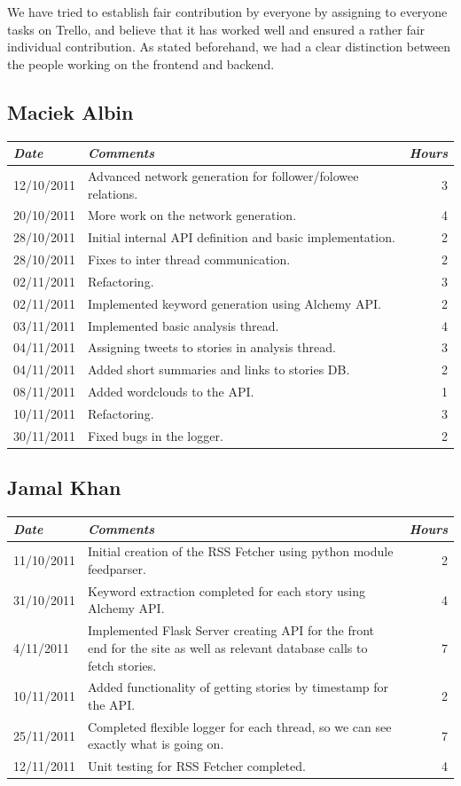 \documentclass{report}
\begin{document}
				We have tried to establish fair contribution by everyone by assigning to everyone tasks on Trello, and believe that it has worked well and ensured a rather fair individual contribution. As stated beforehand, we had a clear distinction between the people working on the frontend and backend.
		
		  \subsection{Maciek Albin}
		    \begin{tabular}{l | p{10cm} r}
		     \emph{\large Date} & \emph{\large Comments} & \emph{\large Hours}\\
		     \hline
		     12/10/2011 & Advanced network generation for follower/folowee relations. & 3\\
		     20/10/2011 & More work on the network generation. & 4\\
		     28/10/2011 & Initial internal API definition and basic implementation. & 2\\
		     28/10/2011 & Fixes to inter thread communication. & 2\\
		     02/11/2011 & Refactoring. & 3\\
		     02/11/2011 & Implemented keyword generation using Alchemy API. & 2\\
		     03/11/2011 & Implemented basic analysis thread. & 4\\
		     04/11/2011 & Assigning tweets to stories in analysis thread. & 3\\
		     04/11/2011 & Added short summaries and links to stories DB. & 2\\
		     08/11/2011 & Added wordclouds to the API. & 1\\
		     10/11/2011 & Refactoring. & 3\\
		     30/11/2011 & Fixed bugs in the logger. & 2
		    \end{tabular}

		  \subsection{Jamal Khan}
		  \begin{tabular}{l | p{10cm} r}
	     \emph{\large Date} & \emph{\large Comments} & \emph{\large Hours}\\
	     \hline
		  11/10/2011 & Initial creation of the RSS Fetcher using python module feedparser. & 2\\
	    31/10/2011 & Keyword extraction completed for each story using Alchemy API. & 4\\
	    4/11/2011 & Implemented Flask Server creating API for the front end for the site as well as relevant database calls to fetch stories. & 7\\
	    10/11/2011 & Added functionality of getting stories by timestamp for the API. & 2\\
	    25/11/2011 & Completed flexible logger for each thread, so we can see exactly what is going on. & 7\\
	    12/11/2011 & Unit testing for RSS Fetcher completed. & 4
	  \end{tabular}
\end{document}
